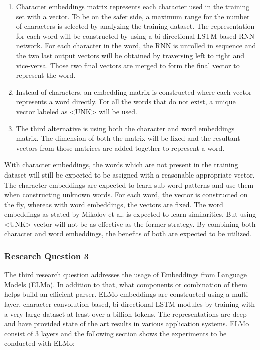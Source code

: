 \documentclass[a4paper, 11pt]{article}
\begin{document}
\begin{enumerate}
\item Character embeddings matrix represents each character used in the training set with a vector. To be on the safer side, a maximum range for the number of characters is selected by analyzing the training dataset. The representation for each word will be constructed by using a bi-directional LSTM based RNN network. For each character in the word, the RNN is unrolled in sequence and the two last output vectors will be obtained by traversing left to right and vice-versa. Those two final vectors are merged to form the final vector to represent the word.
\item Instead of characters, an embedding matrix is constructed where each vector represents a word directly. For all the words that do not exist, a unique vector labeled as <UNK> will be used. 
\item The third alternative is using both the character and word embeddings matrix. The dimension of both the matrix will be fixed and the resultant vectors from those matrices are added together to represent a word. 
\end{enumerate}

With character embeddings, the words which are not present in the training dataset will still be expected to be assigned with a reasonable appropriate vector. The character embeddings are expected to learn sub-word patterns and use them when constructing unknown words. For each word, the vector is constructed on the fly, whereas with word embeddings, the vectors are fixed. The word embeddings as stated by Mikolov et al. \parencite{mikolov2013linguistic} is expected to learn similarities. But using <UNK> vector will not be as effective as the former strategy. By combining both character and word embeddings, the benefits of both are expected to be utilized. 
\subsubsection{Research Question 3}

The third research question addresses the usage of Embeddings from Language Models (ELMo). In addition to that, what components or combination of them helps build an efficient parser. ELMo embeddings are constructed using a multi-layer, character convolution-based, bi-directional LSTM modules by training with a very large dataset at least over a billion tokens. The representations are deep and have provided state of the art results in various application systems. ELMo consist of 3 layers and the following section shows the experiments to be conducted with ELMo:
\end{document}
